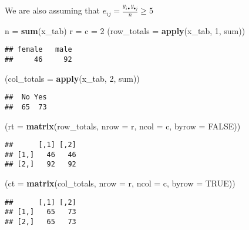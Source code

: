 \documentclass[
]{article}
\newenvironment{Shaded}{\begin{snugshade}}{\end{snugshade}}
\newcommand{\DataTypeTok}[1]{\textcolor[rgb]{0.13,0.29,0.53}{#1}}
\newcommand{\DecValTok}[1]{\textcolor[rgb]{0.00,0.00,0.81}{#1}}
\newcommand{\KeywordTok}[1]{\textcolor[rgb]{0.13,0.29,0.53}{\textbf{#1}}}
\newcommand{\NormalTok}[1]{#1}
\newcommand{\OtherTok}[1]{\textcolor[rgb]{0.56,0.35,0.01}{#1}}
\newcommand{\StringTok}[1]{\textcolor[rgb]{0.31,0.60,0.02}{#1}}
\begin{document}
We are also assuming that
\(e_{ij} = \frac {y_{i\bullet}y_{\bullet j}}{n} \geq 5\)

\begin{Shaded}
\begin{Highlighting}[]
\NormalTok{n =}\StringTok{ }\KeywordTok{sum}\NormalTok{(x_tab)}
\NormalTok{r =}\StringTok{ }\NormalTok{c =}\StringTok{ }\DecValTok{2}
\NormalTok{(}\DataTypeTok{row_totals =} \KeywordTok{apply}\NormalTok{(x_tab, }\DecValTok{1}\NormalTok{, sum))}
\end{Highlighting}
\end{Shaded}

\begin{verbatim}
## female   male 
##     46     92
\end{verbatim}

\begin{Shaded}
\begin{Highlighting}[]
\NormalTok{(}\DataTypeTok{col_totals =} \KeywordTok{apply}\NormalTok{(x_tab, }\DecValTok{2}\NormalTok{, sum))}
\end{Highlighting}
\end{Shaded}

\begin{verbatim}
##  No Yes 
##  65  73
\end{verbatim}

\begin{Shaded}
\begin{Highlighting}[]
\NormalTok{(}\DataTypeTok{rt =} \KeywordTok{matrix}\NormalTok{(row_totals, }\DataTypeTok{nrow =}\NormalTok{ r,}
\DataTypeTok{ncol =}\NormalTok{ c, }\DataTypeTok{byrow =} \OtherTok{FALSE}\NormalTok{))}
\end{Highlighting}
\end{Shaded}

\begin{verbatim}
##      [,1] [,2]
## [1,]   46   46
## [2,]   92   92
\end{verbatim}

\begin{Shaded}
\begin{Highlighting}[]
\NormalTok{(}\DataTypeTok{ct =} \KeywordTok{matrix}\NormalTok{(col_totals, }\DataTypeTok{nrow =}\NormalTok{ r,}
\DataTypeTok{ncol =}\NormalTok{ c, }\DataTypeTok{byrow =} \OtherTok{TRUE}\NormalTok{))}
\end{Highlighting}
\end{Shaded}

\begin{verbatim}
##      [,1] [,2]
## [1,]   65   73
## [2,]   65   73
\end{verbatim}
\end{document}
